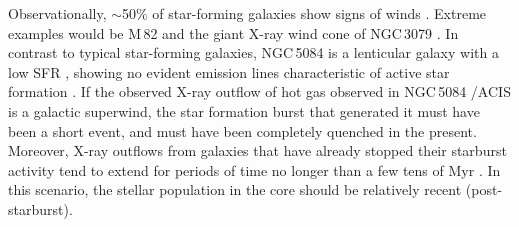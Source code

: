 \documentclass[modern]{CORE-AAS/aastex631}
\begin{document}
Observationally, $\sim$50\% of star-forming galaxies show signs of winds \citep[][]{rubin+2014apj794_156}. Extreme examples would be M\,82 \citep{shopbell+1998apj493_129,heckman+2017incollection_2431} and the giant X-ray wind cone of NGC\,3079 \citep[$R\sim3$ arcmin, 16.3~kpc,][]{hodgeskluck+2020apj903_35}. In contrast to typical star-forming galaxies, NGC\,5084 is a lenticular galaxy with a low SFR \citep[$0.128\pm0.016$ M$_{\odot}$ yr$^{-1}$,][]{osullivan+2018aap618_126}, showing no evident emission lines characteristic of active star formation \citep[][see Fig.\,\ref{fig:NGC5084_optical_spectra}]{moustakas+2006apj164_81}. If the observed X-ray outflow of hot gas observed in NGC\,5084 \Chandra/ACIS is a galactic superwind, the star formation burst that generated it must have been a short event, and must have been completely quenched in the present. Moreover, X-ray outflows from galaxies that have already stopped their starburst activity tend to extend for periods of time no longer than a few tens of Myr \citep{mcquinn+2018mnras477_3164}.  In this scenario, the stellar population in the core should be relatively recent (post-starburst).
\end{document}

